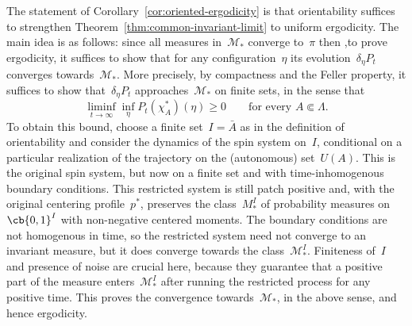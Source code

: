 The statement of Corollary~\ref{cor:oriented-ergodicity} is that orientability suffices to strengthen 
Theorem~\ref{thm:common-invariant-limit} to uniform ergodicity. The main idea is as follows: since all measures in~$\mathcal{M}_*$ converge to~$\pi$ then ,to prove ergodicity, it suffices to show that for any configuration~$\eta$ its evolution~$\delta_\eta P_t$ converges towards~$\mathcal{M}_*$. More precisely, by compactness and the Feller property, it
suffices to show that~$\delta_\eta P_t$ approaches~$\mathcal M_*$ on finite
sets, in the sense that
\begin{equation*}
\liminf_{t\to\infty}\inf_\eta P_t(\chi_A^*)(\eta)\geq0
\qquad\text{for every }A\Subset\Lambda.
\end{equation*}
To obtain this bound, choose a finite set~$I=\bar A$ as in the definition
of orientability and consider the dynamics of the spin system on~$I$, conditional on a particular realization of the trajectory on the (autonomous) set~$U(A)$. This is the original spin system, but now on a finite set and with time-inhomogenous boundary conditions. This restricted system is still patch positive and, with the original
centering profile~$p^*$, preserves the class~$M_*^I$ of probability measures on~$\cb{0,1}^I$ with non-negative centered moments. The boundary conditions are not homogenous in time, so the restricted system need not converge to an invariant measure, but it does converge towards the class~$\mathcal{M}_*^I$. Finiteness of~$I$ and presence of noise are crucial here, because they guarantee that a positive part of the measure enters~$\mathcal{M}_*^I$ after running the restricted process for any positive time. This proves the convergence towards~$\mathcal{M}_*$, in the above sense, and hence ergodicity.

